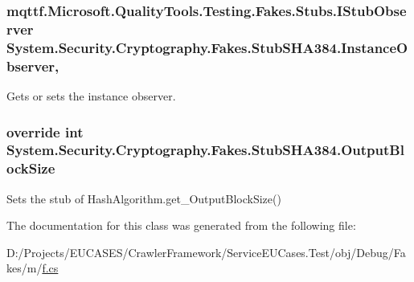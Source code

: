 \hypertarget{class_system_1_1_security_1_1_cryptography_1_1_fakes_1_1_stub_s_h_a384_a2a2682d0531a44b753e2b26d99e9ffe6}{
\subsubsection[{Instance\-Observer}]{\setlength{\rightskip}{0pt plus 5cm}mqttf.\-Microsoft.\-Quality\-Tools.\-Testing.\-Fakes.\-Stubs.\-I\-Stub\-Observer System.\-Security.\-Cryptography.\-Fakes.\-Stub\-S\-H\-A384.\-Instance\-Observer\hspace{0.3cm}{\ttfamily [get]}, {\ttfamily [set]}}}\label{class_system_1_1_security_1_1_cryptography_1_1_fakes_1_1_stub_s_h_a384_a2a2682d0531a44b753e2b26d99e9ffe6}


Gets or sets the instance observer.

\hypertarget{class_system_1_1_security_1_1_cryptography_1_1_fakes_1_1_stub_s_h_a384_a2a165df5d703d53f9d8a34344f01e4b2}{
\subsubsection[{Output\-Block\-Size}]{\setlength{\rightskip}{0pt plus 5cm}override int System.\-Security.\-Cryptography.\-Fakes.\-Stub\-S\-H\-A384.\-Output\-Block\-Size\hspace{0.3cm}{\ttfamily [get]}}}\label{class_system_1_1_security_1_1_cryptography_1_1_fakes_1_1_stub_s_h_a384_a2a165df5d703d53f9d8a34344f01e4b2}


Sets the stub of Hash\-Algorithm.\-get\-\_\-\-Output\-Block\-Size()



The documentation for this class was generated from the following file\-:\begin{DoxyCompactItemize}
\item 
D\-:/\-Projects/\-E\-U\-C\-A\-S\-E\-S/\-Crawler\-Framework/\-Service\-E\-U\-Cases.\-Test/obj/\-Debug/\-Fakes/m/\hyperlink{m_2f_8cs}{f.\-cs}\end{DoxyCompactItemize}

